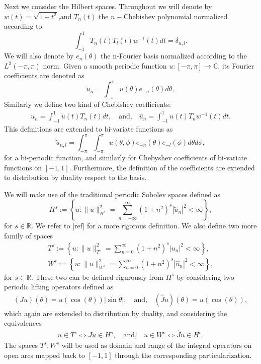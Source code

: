 \documentclass{article}
\newcommand{\todo}[1]{{\color{red}[#1]}}
\newcommand{\IC}{{\mathbb C}}
\newcommand{\IR}{{\mathbb R}}
\begin{document}
Next we consider the Hilbert spaces. Throughout we will denote by $w(t) = \sqrt{1-t^2}$,and $T_n(t)$ the $n-$Chebishev polynomial normalized according to $$\int_{-1}^1 T_n(t) T_l(t) w^{-1}(t) dt = \delta_{n,l}.$$ We will also denote by $e_n(\theta)$ the n-Fourier basis normalized according to the $L^2(-\pi,\pi)$ norm. 
Given a smooth periodic function $u :[-\pi,\pi] \rightarrow \IC$, its Fourier coefficients are denoted as
$$
\widetilde{u}_n = \int_{-\pi}^\pi u(\theta) e_{-n}(\theta) d\theta, 
$$
Similarly we define two kind of Chebishev coefficients:
\begin{align*}
u_n = \int_{-1}^{1} u(t) T_n(t) dt, \quad \text{and,} \quad  \widehat{u}_n = \int_{-1}^1 u(t) T_n w^{-1}(t)dt.
\end{align*}
This definitions are extended to bi-variate functions as 
$$\widetilde{u}_{n,l} = \int_{-\pi}^{\pi}\int_{-\pi}^\pi u(\theta,\phi) e_{-n}(\theta)e_{-l}(\phi) d\theta d\phi,$$
for a bi-periodic function, and similarly  for Chebyshev coefficients of  bi-variate functions on $[-1,1]$. Furthermore, the definition of the coefficients are extended to distribution by duality respect to the basis. 

We will make use of the traditional periodic Sobolev spaces defined as 
$$
H^s := \left\lbrace u : \| u\|_{H^s}^2 = \sum_{n=-\infty}^\infty (1+n^2)^s |\widetilde{u}_n|^2 < \infty \right\rbrace,
$$
for $s\in \IR$. We refer to \todo{ref} for a more rigorous definition. We also define two more family of spaces
\begin{align*}
T^s := \left\lbrace u : \| u\|_{T^s}^2 = \sum_{n=0}^\infty (1+n^2)^s |{u}_n|^2 < \infty \right\rbrace, \\
W^s := \left\lbrace u : \| u\|_{W^s}^2 = \sum_{n=0}^\infty (1+n^2)^s |\widehat{u}_n|^2 < \infty \right\rbrace,
\end{align*} 
for $s \in \IR$. These two can be defined rigurously from $H^s$ by considering two periodic lifting operators defined as 
\begin{align}
\label{eq:liffings}
(Ju) (\theta) = u(\cos(\theta)) | \sin \theta|, \quad \text{and,} \quad
(\widehat{J}u)(\theta) = u (\cos(\theta)),
\end{align}
which again are extended to distribution by duality, and considering the equivalences 
\begin{align*}
u \in T^s \Leftrightarrow Ju \in H^s, \quad \text{and,} \quad u \in W^s \Leftrightarrow \widehat{J}u \in H^s.
\end{align*}
The spaces $T^s,W^s$ will be used as domain and range of the integral operators on open arcs mapped back to $[-1,1]$ through the corresponding particularization.
\end{document}
